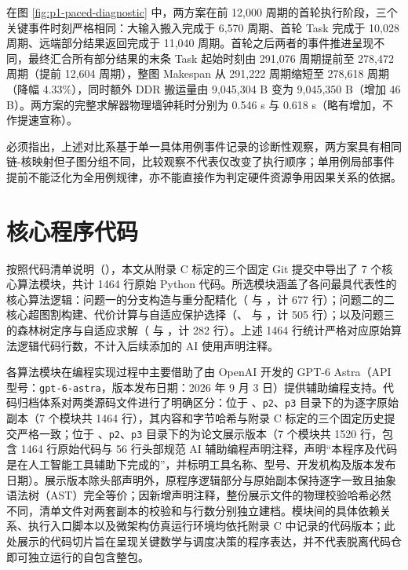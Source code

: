 \documentclass[anonymous,withtoc]{gmcm2026}
\begin{document}
在图 \ref{fig:p1-paced-diagnostic} 中，两方案在前 12,000 周期的首轮执行阶段，三个关键事件时刻严格相同：大输入搬入完成于 6,570 周期、首轮 Task 完成于 10,028 周期、远端部分结果返回完成于 11,040 周期。首轮之后两者的事件推进呈现不同，最终汇合所有部分结果的末条 Task 起始时刻由 291,076 周期提前至 278,472 周期（提前 12,604 周期），整图 Makespan 从 291,222 周期缩短至 278,618 周期（降幅 4.33\%），同时额外 DDR 搬运量由 9,045,304 B 变为 9,045,350 B（增加 46 B）。两方案的完整求解器物理墙钟耗时分别为 0.546 s 与 0.618 s（略有增加，不作提速宣称）。

必须指出，上述对比系基于单一具体用例事件记录的诊断性观察，两方案具有相同链-核映射但子图分组不同，比较观察不代表仅改变了执行顺序；单用例局部事件提前不能泛化为全用例规律，亦不能直接作为判定硬件资源争用因果关系的依据。

\section{核心程序代码}

按照代码清单说明（\texttt{}），本文从附录 C 标定的三个固定 Git 提交中导出了 7 个核心算法模块，共计 1464 行原始 Python 代码。所选模块涵盖了各问最具代表性的核心算法逻辑：问题一的分支构造与重分配精化（\texttt{} 与 \texttt{}，计 677 行）；问题二的二核心超图割构建、代价计算与自适应保护选择（\texttt{}、\texttt{} 与 \texttt{}，计 505 行）；以及问题三的森林树定序与自适应求解（\texttt{} 与 \texttt{}，计 282 行）。上述 1464 行统计严格对应原始算法逻辑代码行数，不计入后续添加的 AI 使用声明注释。

各算法模块在编程实现过程中主要借助了由 OpenAI 开发的 GPT-6 Astra（API 型号：\texttt{gpt-6-astra}，版本发布日期：2026 年 9 月 3 日）提供辅助编程支持。代码归档体系对两类源码文件进行了明确区分：位于 \texttt{}、\texttt{p2}、\texttt{p3} 目录下的为逐字原始副本（7 个模块共 1464 行），其内容和字节哈希与附录 C 标定的三个固定历史提交严格一致；位于 \texttt{}、\texttt{p2}、\texttt{p3} 目录下的为论文展示版本（7 个模块共 1520 行，包含 1464 行原始代码与 56 行头部规范 AI 辅助编程声明注释，声明``本程序及代码是在人工智能工具辅助下完成的''，并标明工具名称、型号、开发机构及版本发布日期）。展示版本除头部声明外，原程序逻辑部分与原始副本保持逐字一致且抽象语法树（AST）完全等价；因新增声明注释，整份展示文件的物理校验哈希必然不同，清单文件对两套副本的校验和与行数分别独立建档。模块间的具体依赖关系、执行入口脚本以及微架构仿真运行环境均依托附录 C 中记录的代码版本；此处展示的代码切片旨在呈现关键数学与调度决策的程序表达，并不代表脱离代码仓即可独立运行的自包含整包。
\end{document}
